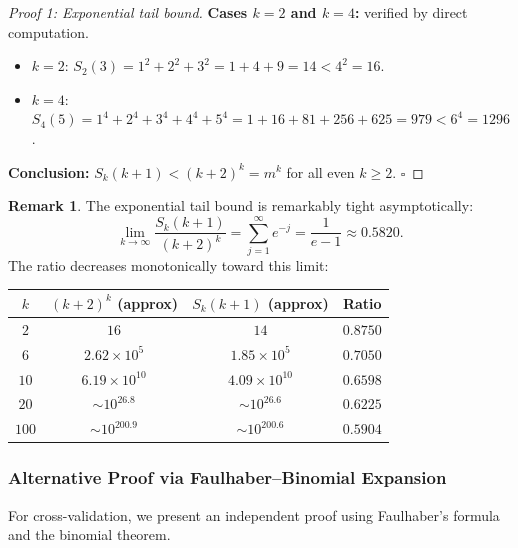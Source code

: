 \documentclass[12pt,a4paper]{article}
\theoremstyle{plain}
\theoremstyle{definition}
\newtheorem{remark}[theorem]{Remark}
\begin{document}
\begin{proof}[Proof 1: Exponential tail bound]
  \noindent\textbf{Cases $k = 2$ and $k = 4$:} verified by direct computation.
  \begin{itemize}[nosep]
    \item $k=2$: $S_2(3) = 1^2 + 2^2 + 3^2 = 1 + 4 + 9 = 14 < 4^2 = 16$.~\checkmark
    \item $k=4$: $S_4(5) = 1^4 + 2^4 + 3^4 + 4^4 + 5^4
      = 1 + 16 + 81 + 256 + 625 = 979 < 6^4 = 1296$.~\checkmark
  \end{itemize}

  \textbf{Conclusion:} $S_k(k+1) < (k+2)^k = m^k$ for all even $k \ge 2$.
  \hfill$\square$
\end{proof}

\begin{remark}
  The exponential tail bound is remarkably tight asymptotically:
  \[
    \lim_{k \to \infty} \frac{S_k(k+1)}{(k+2)^k}
    = \sum_{j=1}^{\infty} e^{-j}
    = \frac{1}{e - 1} \approx 0.5820.
  \]
  The ratio decreases monotonically toward this limit:
  \begin{center}
  \begin{tabular}{cccc}
  \toprule
  $k$ & $(k+2)^k$ (approx) & $S_k(k+1)$ (approx) & Ratio \\
  \midrule
  $2$ & $16$ & $14$ & $0.8750$ \\
  $6$ & $2.62 \times 10^5$ & $1.85 \times 10^5$ & $0.7050$ \\
  $10$ & $6.19 \times 10^{10}$ & $4.09 \times 10^{10}$ & $0.6598$ \\
  $20$ & $\sim 10^{26.8}$ & $\sim 10^{26.6}$ & $0.6225$ \\
  $100$ & $\sim 10^{200.9}$ & $\sim 10^{200.6}$ & $0.5904$ \\
  \bottomrule
  \end{tabular}
  \end{center}
\end{remark}

\subsubsection{Alternative Proof via Faulhaber--Binomial Expansion}
\label{sec:pnb-alt}

For cross-validation, we present an independent proof using Faulhaber's
formula~\cite{Faulhaber,Bernoulli} and the binomial theorem.
\end{document}
